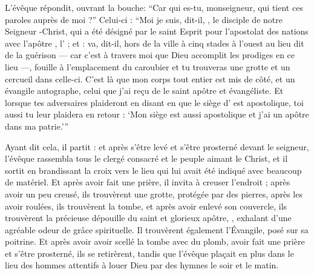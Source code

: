 L'évêque répondit, ouvrant la  bouche: 
\enquote{Car qui es-tu, monseigneur, qui tient ces paroles auprès de moi ?}
Celui-ci : \enquote{Moi je suis, dit-il, , le disciple de notre Seigneur -Christ,
qui a été désigné par le saint Esprit pour l'apostolat des nations avec l'apôtre , l' ;
et  : va, dit-il, hors de la ville à cinq stades à l'ouest 
au lieu dit de la guérison --- car c'est à travers moi que Dieu accomplit les prodiges en ce lieu ---, 
fouille à l'emplacement du caroubier et 
 tu trouveras une grotte et un cercueil dans celle-ci.
C'est là que mon corps tout entier est mis de côté, et un évangile autographe,  
celui que j'ai reçu de  le saint apôtre et évangéliste.
Et lorsque tes adversaires plaideront en disant en  
que le siège d' est apostolique, toi aussi tu leur plaidera en retour : \enquote{Mon siège est aussi apostolique et j'ai un apôtre dans ma patrie.}}

Ayant dit cela, il partit : et après s'être levé et s'être prosterné devant le seigneur, l'évêque 
rassembla tous le clergé consacré et le peuple aimant le Christ, et il sortit en brandissant la croix vers le lieu qui lui avait été indiqué avec beaucoup de matériel.
Et après avoir fait une prière, il invita à creuser l'endroit ;  après avoir un peu creusé, ils trouvèrent une grotte, protégée par des pierres,  après les avoir roulées, ils trouvèrent la tombe, et après avoir enlevé son couvercle, ils trouvèrent la précieuse dépouille du saint et glorieux apôtre, , exhalant d'une agréable odeur de grâce spirituelle.  
Il trouvèrent également l'Évangile, posé sur sa poitrine.
Et après avoir avoir scellé la tombe avec du plomb, avoir fait une prière et s'être prosterné, ils se retirèrent, tandis que l'évêque plaçait en plus dans le lieu des hommes attentifs à louer Dieu par des hymnes le soir et le matin.

